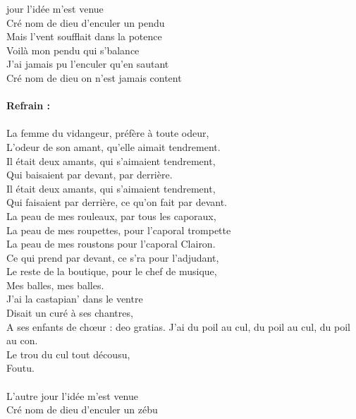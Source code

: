 
 jour l'idée m'est venue
\\Cré nom de dieu d'enculer un pendu
\\Mais l'vent soufflait dans la potence
\\Voilà mon pendu qui s'balance
\\J'ai jamais pu l'enculer qu'en sautant
\\Cré nom de dieu on n'est jamais content
\\\\\textbf{Refrain :}
\\\\La femme du vidangeur, préfère à toute odeur,
\\L'odeur de son amant, qu'elle aimait tendrement.
\\Il était deux amants, qui s'aimaient tendrement,
\\Qui baisaient par devant, par derrière.
\\Il était deux amants, qui s'aimaient tendrement,
\\Qui faisaient par derrière, ce qu'on fait par devant.
\\La peau de mes rouleaux, par tous les caporaux,
\\La peau de mes roupettes, pour l'caporal trompette
\\La peau de mes roustons pour l'caporal Clairon.
\\Ce qui prend par devant, ce s'ra pour l'adjudant,
\\Le reste de la boutique, pour le chef de musique,
\\Mes balles, mes balles.
\\J'ai la castapian' dans le ventre
\\Disait un curé à ses chantres,
\\A ses enfants de chœur : deo gratias.
{J'ai du poil au cul, du poil au cul, du poil au con.}
\\Le trou du cul tout décousu,
\\Foutu.
\\\\L'autre jour l'idée m'est venue
\\Cré nom de dieu d'enculer un zébu
